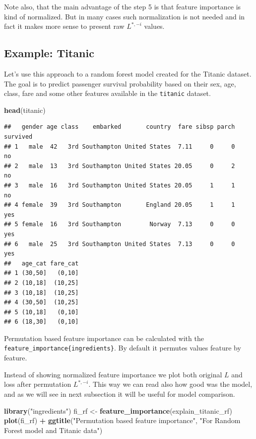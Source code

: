 \documentclass[12pt,]{krantz}
\newenvironment{Shaded}{\begin{snugshade}}{\end{snugshade}}
\newcommand{\KeywordTok}[1]{\textcolor[rgb]{0.13,0.29,0.53}{\textbf{#1}}}
\newcommand{\NormalTok}[1]{#1}
\newcommand{\OperatorTok}[1]{\textcolor[rgb]{0.81,0.36,0.00}{\textbf{#1}}}
\newcommand{\StringTok}[1]{\textcolor[rgb]{0.31,0.60,0.02}{#1}}
\theoremstyle{definition}
\theoremstyle{definition}
\theoremstyle{definition}
\theoremstyle{remark}
\begin{document}
Note also, that the main advantage of the step 5 is that feature
importance is kind of normalized. But in many cases such normalization
is not needed and in fact it makes more sense to present raw
\(L^{*,-i}\) values.

\hypertarget{example-titanic-4}{%
\subsection{Example: Titanic}\label{example-titanic-4}}

Let's use this approach to a random forest model created for the Titanic
dataset. The goal is to predict passenger survival probability based on
their sex, age, class, fare and some other features available in the
\texttt{titanic} dataset.

\begin{Shaded}
\begin{Highlighting}[]
\KeywordTok{head}\NormalTok{(titanic)}
\end{Highlighting}
\end{Shaded}

\begin{verbatim}
##   gender age class    embarked       country  fare sibsp parch survived
## 1   male  42   3rd Southampton United States  7.11     0     0       no
## 2   male  13   3rd Southampton United States 20.05     0     2       no
## 3   male  16   3rd Southampton United States 20.05     1     1       no
## 4 female  39   3rd Southampton       England 20.05     1     1      yes
## 5 female  16   3rd Southampton        Norway  7.13     0     0      yes
## 6   male  25   3rd Southampton United States  7.13     0     0      yes
##   age_cat fare_cat
## 1 (30,50]   (0,10]
## 2 (10,18]  (10,25]
## 3 (10,18]  (10,25]
## 4 (30,50]  (10,25]
## 5 (10,18]   (0,10]
## 6 (18,30]   (0,10]
\end{verbatim}

Permutation based feature importance can be calculated with the
\texttt{feature\_importance\{ingredients\}}. By default it permutes
values feature by feature.

Instead of showing normalized feature importance we plot both original
\(L\) and loss after permutation \(L^{*,-i}\). This way we can read also
how good was the model, and as we will see in next subsection it will be
useful for model comparison.

\begin{Shaded}
\begin{Highlighting}[]
\KeywordTok{library}\NormalTok{(}\StringTok{"ingredients"}\NormalTok{)}
\NormalTok{fi_rf <-}\StringTok{ }\KeywordTok{feature_importance}\NormalTok{(explain_titanic_rf) }
\KeywordTok{plot}\NormalTok{(fi_rf) }\OperatorTok{+}\StringTok{ }\KeywordTok{ggtitle}\NormalTok{(}\StringTok{"Permutation based feature importance"}\NormalTok{, }\StringTok{"For Random Forest model and Titanic data"}\NormalTok{)}
\end{Highlighting}
\end{Shaded}
\end{document}
